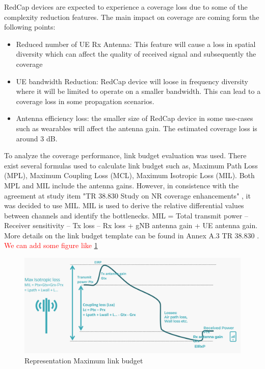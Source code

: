\documentclass[conference]{IEEEtran}
\begin{document}
RedCap devices are expected to experience a coverage loss due to some of the complexity reduction features. The main impact on coverage are coming form the following points:
\begin{itemize}
    \item Reduced number of UE Rx Antenna: This feature will cause a loss in spatial diversity which can affect the quality of received signal and subsequently the coverage 
    \item UE bandwidth Reduction: RedCap device will loose in frequency diversity where it will be limited to operate on a smaller bandwidth. This can lead to a coverage loss in some propagation scenarios.
    \item Antenna efficiency loss: the smaller size of RedCap device in some use-cases such as wearables will affect the antenna gain. The estimated coverage loss is around 3 dB.
\end{itemize}

To analyze the coverage performance, link budget evaluation was used. There exist several formulas used to calculate link budget such as, Maximum Path Loss (MPL), Maximum Coupling Loss (MCL), Maximum Isotropic Loss (MIL). Both MPL and MIL include the antenna gains. However, in consistence with the agreement at study item "TR 38.830 Study on NR coverage enhancements" \cite{3gpp_study_nodate-3_38.830}, it was decided to use MIL. MIL is used to derive the relative differential values between channels and identify the bottlenecks. MIL = Total transmit power – Receiver sensitivity – Tx loss – Rx loss + gNB antenna gain + UE antenna gain. More details on the link budget template can be found in Annex A.3 TR 38.830 \cite{3gpp_study_nodate-3_38.830}. \textcolor{red}{We can add some figure like \ref{fig:MIL-diagram}}

\begin{figure}
    \centering
    \includegraphics[width=\linewidth]{Pictures/Link budget representation.png}
    \caption{Representation Maximum link budget}
    \label{fig:MIL-diagram}
\end{figure}
\end{document}
